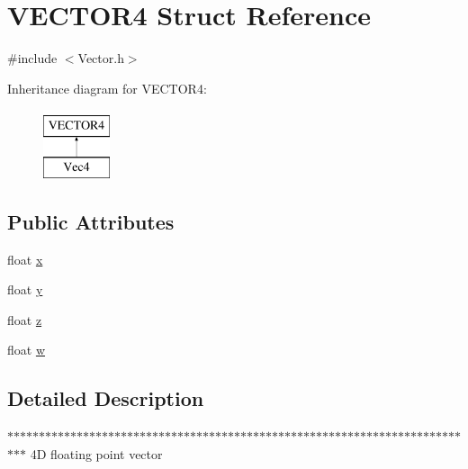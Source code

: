 \hypertarget{struct_v_e_c_t_o_r4}{
\section{VECTOR4 Struct Reference}
\label{struct_v_e_c_t_o_r4}
}


{\ttfamily \#include $<$Vector.h$>$}

Inheritance diagram for VECTOR4:\begin{figure}[H]
\begin{center}
\leavevmode
\includegraphics[height=2.000000cm]{struct_v_e_c_t_o_r4}
\end{center}
\end{figure}
\subsection*{Public Attributes}
\begin{DoxyCompactItemize}
\item 
float \hyperlink{struct_v_e_c_t_o_r4_ae1b2a9e4f7c5b97bb249dc3be2db47b5}{x}
\item 
float \hyperlink{struct_v_e_c_t_o_r4_a0c5ad126135db794c5691cbda1589660}{y}
\item 
float \hyperlink{struct_v_e_c_t_o_r4_af1efc5d779733aafc317cb3166f6146b}{z}
\item 
float \hyperlink{struct_v_e_c_t_o_r4_a9baf0e6a42e3fb90572a1fb238c28403}{w}
\end{DoxyCompactItemize}


\subsection{Detailed Description}
$\ast$$\ast$$\ast$$\ast$$\ast$$\ast$$\ast$$\ast$$\ast$$\ast$$\ast$$\ast$$\ast$$\ast$$\ast$$\ast$$\ast$$\ast$$\ast$$\ast$$\ast$$\ast$$\ast$$\ast$$\ast$$\ast$$\ast$$\ast$$\ast$$\ast$$\ast$$\ast$$\ast$$\ast$$\ast$$\ast$$\ast$$\ast$$\ast$$\ast$$\ast$$\ast$$\ast$$\ast$$\ast$$\ast$$\ast$$\ast$$\ast$$\ast$$\ast$$\ast$$\ast$$\ast$$\ast$$\ast$$\ast$$\ast$$\ast$$\ast$$\ast$$\ast$$\ast$$\ast$$\ast$$\ast$$\ast$$\ast$$\ast$$\ast$$\ast$$\ast$$\ast$$\ast$$\ast$ 4D floating point vector 

